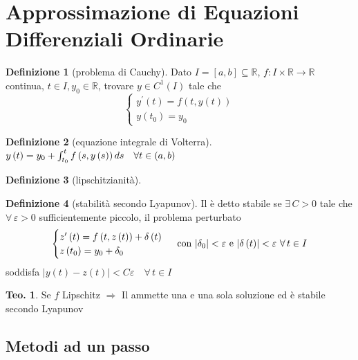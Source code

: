 \documentclass[a4paper,10pt]{article}
\theoremstyle{definition}
\theoremstyle{indentdefinition}
\newtheorem{defn}{Definizione}[section]
\theoremstyle{indenttheorem}
\newtheorem{thm}{Teo.}
\theoremstyle{myremark}
\theoremstyle{indentgeneral}
\theoremstyle{plain}
\theoremstyle{plain}
\begin{document}
\pagebreak{}

\section{Approssimazione di Equazioni Differenziali Ordinarie}
\begin{defn}[problema di Cauchy]
\label{def:problema-di-cauchy}Dato $I=\left[a,b\right]\subseteq\mathbb{R}$,
$f\colon I\times\mathbb{R}\rightarrow\mathbb{R}$ continua, $t\in I,y_{0}\in\mathbb{R}$,
trovare $y\in C^{1}\left(I\right)$ tale che
\[
\begin{cases}
y^{\prime}\left(t\right)=f\left(t,y\left(t\right)\right)\\
y\left(t_{0}\right)=y_{0}
\end{cases}
\]
\end{defn}

\begin{defn}[equazione integrale di Volterra]
$y\left(t\right)=y_{0}+\intop_{t_{0}}^{t}f\left(s,y\left(s\right)\right)ds\quad\forall t\in\left(a,b\right)$
\end{defn}

\begin{defn}[lipschitzianità]
\end{defn}

\begin{defn}[stabilità secondo Lyapunov]
Il  è detto stabile se $\exists\,C>0$
tale che $\forall\,\varepsilon>0$ sufficientemente piccolo, il problema
perturbato
\begin{equation}
\begin{cases}
z^{\prime}\left(t\right)=f\left(t,z\left(t\right)\right)+\delta\left(t\right)\\
z\left(t_{0}\right)=y_{0}+\delta_{0}
\end{cases}\text{ con \ensuremath{\left|\delta_{0}\right|<\varepsilon} e \ensuremath{\left|\delta\left(t\right)\right|<\varepsilon} \ensuremath{\forall\,t\in I}}\label{eq:problema-perturbato}
\end{equation}
soddisfa $\left|y\left(t\right)-z\left(t\right)\right|<C\varepsilon\quad\forall\,t\in I$
\end{defn}

\begin{thm}
Se $f$ Lipschitz $\Longrightarrow$ Il 
ammette una e una sola soluzione ed è stabile secondo Lyapunov
\end{thm}


\subsection{Metodi ad un passo}
\end{document}
